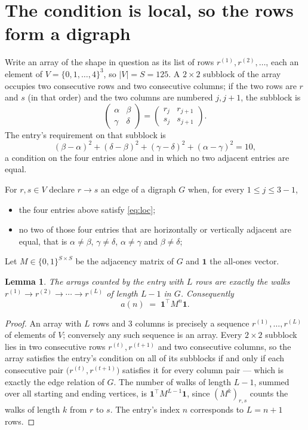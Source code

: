 \documentclass[11pt,a4paper]{article}
\theoremstyle{plain}
\newtheorem{lemma}[theorem]{Lemma}
\theoremstyle{definition}
\begin{document}
\section{The condition is local, so the rows form a digraph}

Write an array of the shape in question as its list of rows
$r^{(1)},r^{(2)},\dots$, each an element of
$V=\{0,1,\dots,4\}^{3}$, so $|V|=S=125$. A $2\times2$ subblock of the array
occupies two consecutive rows and two consecutive columns; if the two rows are $r$
and $s$ (in that order) and the two columns are numbered $j,j+1$,
the subblock is
\[
\begin{pmatrix}\alpha&\beta\\\gamma&\delta\end{pmatrix}=\begin{pmatrix}r_j&r_{j+1}\\s_j&s_{j+1}\end{pmatrix}.
\]
The entry's requirement on that subblock is
\begin{equation}\label{eq:loc}
(\beta-\alpha)^2+(\delta-\beta)^2+(\gamma-\delta)^2+(\alpha-\gamma)^2=10,
\end{equation}
a condition on the four entries alone and in which no two adjacent entries are equal.

For $r,s\in V$ declare $r\to s$ an edge of a digraph $G$ when, for every
$1\le j\le 3-1$,
\begin{itemize}
\item the four entries above satisfy \eqref{eq:loc};
\item no two of those four entries that are horizontally or vertically adjacent are equal, that is $\alpha\ne\beta$, $\gamma\ne\delta$, $\alpha\ne\gamma$ and $\beta\ne\delta$;
\end{itemize}
Let $M\in\{0,1\}^{S\times S}$ be the adjacency matrix of $G$ and $\mathbf{1}$ the
all-ones vector.

\begin{lemma}\label{lem:walk}
The arrays counted by the entry with $L$ rows are exactly the walks
$r^{(1)}\to r^{(2)}\to\cdots\to r^{(L)}$ of length $L-1$ in $G$. Consequently
\[
a(n)\;=\;\mathbf{1}^{\!\top}M^{n}\mathbf{1} .
\]
\end{lemma}

\begin{proof}
An array with $L$ rows and $3$ columns is precisely a sequence
$r^{(1)},\dots,r^{(L)}$ of elements of $V$; conversely any such sequence is an array.
Every $2\times2$ subblock lies in two consecutive rows $r^{(t)},r^{(t+1)}$ and two
consecutive columns, so the array satisfies the entry's condition on all of its subblocks
if and only if each consecutive pair $\bigl(r^{(t)},r^{(t+1)}\bigr)$ satisfies it for
every column pair --- which is exactly the edge relation of $G$. The number of walks of
length $L-1$, summed over all starting and ending vertices, is
$\mathbf{1}^{\!\top}M^{L-1}\mathbf{1}$, since $(M^{k})_{r,s}$ counts the walks of
length $k$ from $r$ to $s$. The entry's index $n$ corresponds to $L=n+1$ rows.
\end{proof}
\end{document}
